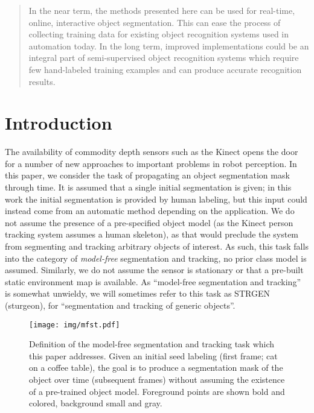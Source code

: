 \documentclass[journal]{IEEEtran}
\renewcommand{\todo}[1]{}
\begin{document}
\begin{abstract}
In the near term, the methods presented here can be used for real-time, online, interactive object segmentation.  This can ease the process of collecting training data for existing object recognition systems used in automation today. In the long term, improved implementations could be an integral part of semi-supervised object recognition systems which require few hand-labeled training examples and can produce accurate recognition results.

\end{abstract}

\section{Introduction}
\label{sec:intro}

The availability of commodity depth sensors such as the Kinect opens the door for a number of new approaches to important problems in robot perception.  In this paper, we consider the task of propagating an object segmentation mask through time. It is assumed that a single initial segmentation is given; in this work the initial segmentation is provided by human labeling, but this input could instead come from an automatic method depending on the application.  We do not assume the presence of a pre-specified object model (\eg as the Kinect person tracking system assumes a human skeleton), as that would preclude the system from segmenting and tracking arbitrary objects of interest.  As such, this task falls into the category of \emph{model-free} segmentation and tracking, \ie no prior class model is assumed.  Similarly, we do not assume the sensor is stationary or that a pre-built static environment map is available.  As ``model-free segmentation and tracking'' is somewhat unwieldy, we will sometimes refer to this task as STRGEN (sturgeon), for ``segmentation and tracking of generic objects''. \todo{Not settled on a name yet, but need something.  Happy to hear suggestions.}

\begin{figure}
  \centering
  \texttt{[image: img/mfst.pdf]}
  \caption{Definition of the model-free segmentation and tracking task which this paper addresses.  Given an initial seed labeling (first frame; cat on a coffee table), the goal is to produce a segmentation mask of the object over time (subsequent frames) without assuming the existence of a pre-trained object model.  Foreground points are shown bold and colored, background small and gray.}
  \label{fig:goal}
\end{figure}
\end{document}
